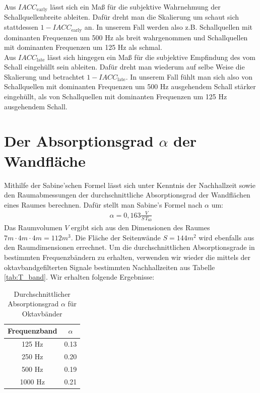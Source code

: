 Aus $IACC_{\mathrm{early}}$ lässt sich ein Maß für die subjektive Wahrnehmung der Schallquellenbreite ableiten.
Dafür dreht man die Skalierung um schaut sich stattdessen $1-IACC_{\mathrm{early}}$ an. 
In unserem Fall werden also z.B. Schallquellen mit dominanten Frequenzen um 500 Hz als breit wahrgenommen und Schallquellen mit dominanten Frequenzen um 125 Hz als schmal. \\
Aus $IACC_{\mathrm{late}}$ lässt sich hingegen ein Maß für die subjektive Empfindung des \glqq vom Schall eingehüllt sein\grqq{} ableiten.
Dafür dreht man wiederum auf selbe Weise die Skalierung und betrachtet $1-IACC_{\mathrm{late}}$.
In unserem Fall fühlt man sich also von Schallquellen mit dominanten Frequenzen um 500 Hz ausgehendem Schall stärker eingehüllt, als von 
Schallquellen mit dominanten Frequenzen um 125 Hz ausgehendem Schall.


\section{Der Absorptionsgrad \boldmath$\alpha$ der Wandfläche}
\label{sec:alpha}
Mithilfe der Sabine'schen Formel lässt sich unter Kenntnis der Nachhallzeit sowie den Raumabmessungen der durchschnittliche Absorptionsgrad der Wandflächen eines Raumes berechnen. 
Dafür stellt man Sabine's Formel nach $\alpha$ um:
\begin{align*}
\alpha = 0,163 \frac{V}{S\,T_{60}}
\end{align*}
Das Raumvolumen $V$ ergibt sich aus den Dimensionen des Raumes $7m \cdot 4m \cdot 4m = 112m^3$.
Die Fläche der Seitenwände $S = 144m^2$ wird ebenfalls aus den Raumdimensionen errechnet.
Um die durchschnittlichen Absorptionsgrade in bestimmten Frequenzbändern zu erhalten, verwenden wir wieder die mittels der oktavbandgefilterten Signale bestimmten Nachhallzeiten aus Tabelle \ref{tab:T_band}.
Wir erhalten folgende Ergebnisse:
\begin{table}[H]
    \centering
    \caption{Durchschnittlicher Absorptionsgrad $\alpha$ für Oktavbänder}
    \label{tab:alpha}
    \begin{tabular}[\textwidth]{|c|c|}
    \hline
        Frequenzband &  $\alpha$ \\
        \hline
        125 Hz & 0.13 \\
        250 Hz & 0.20 \\
        500 Hz & 0.19 \\
        1000 Hz & 0.21 \\
        \hline
    \end{tabular}
\end{table}

